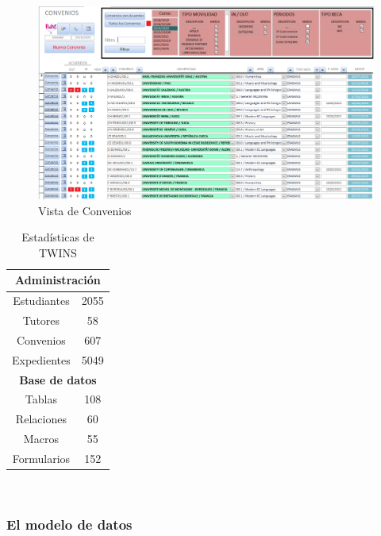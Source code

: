 \begin{figure}
	\includegraphics[width=\textwidth]{img/Capturas de TWINS/vistaConvenios.png}
	\caption{Vista de Convenios}
	\label{fig:vistaConvenios}
\end{figure}

\begin{table}[h]
	\begin{center}
		\begin{tabular}{ | c | c | } 
			\hline
			\multicolumn{2}{|c|}{\textbf{Administración}} \\
			\hline
			Estudiantes \footnotemark & 2055 \\ 
			\hline
			Tutores & 58 \\
			\hline
			Convenios  & 607 \\ 
			\hline
			Expedientes & 5049 \\ 
			\hline
			\multicolumn{2}{|c|}{\textbf{Base de datos}} \\
			\hline
			Tablas & 108 \\
			\hline
			Relaciones & 60 \\
			\hline
			Macros & 55 \\
			\hline
			Formularios & 152 \\
			\hline
		\end{tabular}
		\caption{Estadísticas de TWINS}
		\label{tab:estadisticasTWINS}
	\end{center}
\end{table}~



\subsubsection{El modelo de datos}
\label{ModeloDatos}

